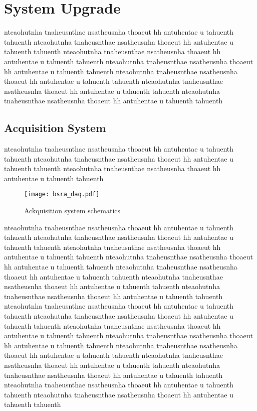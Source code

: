 \section{System Upgrade}
nteaohutnha tnaheusnthae nsatheusnha thoaeut hh antuhentae u tahuenth tahuenth
nteaohutnha tnaheusnthae nsatheusnha thoaeut hh antuhentae u tahuenth tahuenth
nteaohutnha tnaheusnthae nsatheusnha thoaeut hh antuhentae u tahuenth tahuenth
nteaohutnha tnaheusnthae nsatheusnha thoaeut hh antuhentae u tahuenth tahuenth
nteaohutnha tnaheusnthae nsatheusnha thoaeut hh antuhentae u tahuenth tahuenth
nteaohutnha tnaheusnthae nsatheusnha thoaeut hh antuhentae u tahuenth tahuenth
nteaohutnha tnaheusnthae nsatheusnha thoaeut hh antuhentae u tahuenth tahuenth


\subsection{Acquisition System}
nteaohutnha tnaheusnthae nsatheusnha thoaeut hh antuhentae u tahuenth tahuenth
nteaohutnha tnaheusnthae nsatheusnha thoaeut hh antuhentae u tahuenth tahuenth
nteaohutnha tnaheusnthae nsatheusnha thoaeut hh antuhentae u tahuenth tahuenth
\begin{figure}[!tbh]
    \centering
    \texttt{[image: bsra\_daq.pdf]}
    \caption{Ackquisition system schematics}
    \label{fig:bsra_daq}
\end{figure}
nteaohutnha tnaheusnthae nsatheusnha thoaeut hh antuhentae u tahuenth tahuenth
nteaohutnha tnaheusnthae nsatheusnha thoaeut hh antuhentae u tahuenth tahuenth
nteaohutnha tnaheusnthae nsatheusnha thoaeut hh antuhentae u tahuenth tahuenth
nteaohutnha tnaheusnthae nsatheusnha thoaeut hh antuhentae u tahuenth tahuenth
nteaohutnha tnaheusnthae nsatheusnha thoaeut hh antuhentae u tahuenth tahuenth
nteaohutnha tnaheusnthae nsatheusnha thoaeut hh antuhentae u tahuenth tahuenth
nteaohutnha tnaheusnthae nsatheusnha thoaeut hh antuhentae u tahuenth tahuenth
nteaohutnha tnaheusnthae nsatheusnha thoaeut hh antuhentae u tahuenth tahuenth
nteaohutnha tnaheusnthae nsatheusnha thoaeut hh antuhentae u tahuenth tahuenth
nteaohutnha tnaheusnthae nsatheusnha thoaeut hh antuhentae u tahuenth tahuenth
nteaohutnha tnaheusnthae nsatheusnha thoaeut hh antuhentae u tahuenth tahuenth
nteaohutnha tnaheusnthae nsatheusnha thoaeut hh antuhentae u tahuenth tahuenth
nteaohutnha tnaheusnthae nsatheusnha thoaeut hh antuhentae u tahuenth tahuenth
nteaohutnha tnaheusnthae nsatheusnha thoaeut hh antuhentae u tahuenth tahuenth
nteaohutnha tnaheusnthae nsatheusnha thoaeut hh antuhentae u tahuenth tahuenth
nteaohutnha tnaheusnthae nsatheusnha thoaeut hh antuhentae u tahuenth tahuenth

